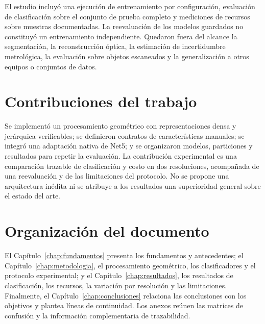 El estudio incluyó una ejecución de entrenamiento por configuración, evaluación de clasificación sobre el conjunto de prueba completo y mediciones de recursos sobre muestras documentadas. La reevaluación de los modelos guardados no constituyó un entrenamiento independiente. Quedaron fuera del alcance la segmentación, la reconstrucción óptica, la estimación de incertidumbre metrológica, la evaluación sobre objetos escaneados y la generalización a otros equipos o conjuntos de datos.

\section{Contribuciones del trabajo}
\label{sec:contribuciones}
Se implementó un procesamiento geométrico con representaciones densa y jerárquica verificables; se definieron contratos de características manuales; se integró una adaptación nativa de Net5; y se organizaron modelos, particiones y resultados para repetir la evaluación. La contribución experimental es una comparación trazable de clasificación y costo en dos resoluciones, acompañada de una reevaluación y de las limitaciones del protocolo. No se propone una arquitectura inédita ni se atribuye a los resultados una superioridad general sobre el estado del arte.

\section{Organización del documento}
\label{sec:organizacion}
El Capítulo~\ref{chap:fundamentos} presenta los fundamentos y antecedentes; el Capítulo~\ref{chap:metodologia}, el procesamiento geométrico, los clasificadores y el protocolo experimental; y el Capítulo~\ref{chap:resultados}, los resultados de clasificación, los recursos, la variación por resolución y las limitaciones. Finalmente, el Capítulo~\ref{chap:conclusiones} relaciona las conclusiones con los objetivos y plantea líneas de continuidad. Los anexos reúnen las matrices de confusión y la información complementaria de trazabilidad.
